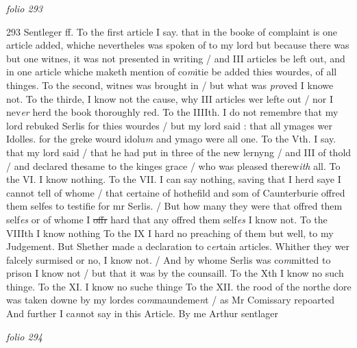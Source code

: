 \documentclass[12pt, a4paper]{book}
\begin{document}
\textit{folio 293}



{\color{Mahogany}293} 
				\marginpar[\vspace{0.5cm}{\textcolor{Gray}{ff.}}]{}
			 Sentleger  ff. To the first article I say. that in the booke of complaint is one article added, whiche nevertheles was spoken of to my lord but because there was but one witnes, it was not presented in writing / and III articles be left out, and in one article whiche maketh mention of co\textit{m}itie be added thies wourdes, of all thinges.  To the second, witnes was brought in / but what was \textit{pro}ved I knowe not.  To the thirde, I know not the cause, why III articles wer lefte out / nor I nev\textit{er }herd the book thoroughly red. To the IIIIth. I do not remembre that my lord rebuked Serlis for thies wourdes / but 
			my lord said : that all ymages wer Idolles. for the greke wourd idolu\textit{m} and ymago were all one. To the Vth. I say. that my lord said / that he had put in three of the new lernyng / and III of thold / and declared thesame to the kinges grace / who was pleased therew\textit{ith} all. To the VI. I know nothing.  To the VII. I can say nothing, saving that I herd saye I cannot tell of whome / that certaine of hothefild and som of Caunterburie offred them selfes to testifie for mr Serlis. / But how many they were that offred them self\textit{es} or of whome I \sout{offr }hard that any  offred them self\textit{es} I know not.  To the VIIIth I know nothing To the IX I hard no preaching of them but well, to my Judgement. But Shether made a declaration to c\textit{er}tain articles. Whither they wer falcely surmised or no, I  know not. / And by whome Serlis was co\textit{m}mitted to prison I know not / but that it was by the counsaill. To the Xth I know no such thinge.  To the XI. I know no suche thinge To the XII. the rood of the northe dore was taken downe by my lordes co\textit{m}maundeme\textit{n}t / as Mr Comissary repoarted And further I ca\textit{n}not say in this Article.   By me Arthur sentlager

\dotfill
					

\textit{folio 294}


         \vspace{4cm}
         
\dotfill
					  \section*{}
\end{document}
